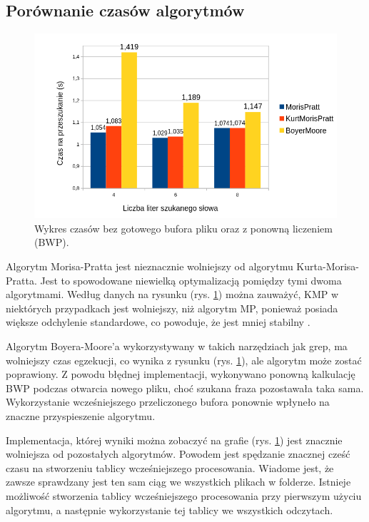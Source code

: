 \subsection{Porównanie czasów algorytmów}

\begin{figure}[htbp]
    \centering
    \includegraphics[width=\textwidth]{./images/GraphFirstAttempt.png}
    \caption{Wykres czasów bez gotowego bufora pliku oraz z ponowną 
    liczeniem (BWP).}
    \label{fig:GraphFirstAttempt}
\end{figure}

Algorytm Morisa-Pratta jest nieznacznie wolniejszy od algorytmu 
Kurta-Morisa-Pratta. Jest to spowodowane niewielką optymalizacją pomiędzy tymi 
dwoma algorytmami. Według danych na rysunku (rys. \ref{fig:GraphFirstAttempt}) można 
zauważyć, KMP w niektórych przypadkach jest wolniejszy, niż algorytm MP, 
ponieważ posiada większe odchylenie standardowe, co powoduje, że jest mniej
stabilny \label{text:stabilnośćGC}. 

Algorytm Boyera-Moore'a wykorzystywany w takich narzędziach jak grep, ma 
wolniejszy czas egzekucji, co wynika z rysunku (rys. \ref{fig:GraphFirstAttempt}), ale 
algorytm może zostać poprawiony. Z powodu błędnej implementacji, wykonywano
ponowną kalkulację BWP podczas otwarcia nowego pliku, choć szukana fraza pozostawała
taka sama. Wykorzystanie wcześniejszego przeliczonego bufora ponownie wpłyneło na znaczne
przyspieszenie algorytmu.

Implementacja, której wyniki można zobaczyć na grafie (rys. \ref{fig:GraphFirstAttempt}) jest
znacznie wolniejsza od pozostałych algorytmów. Powodem jest spędzanie znacznej
cześć czasu na stworzeniu tablicy wcześniejszego procesowania. Wiadome jest, że zawsze 
sprawdzany jest ten sam ciąg we wszystkich plikach w folderze. Istnieje możliwość 
stworzenia tablicy wcześniejszego procesowania przy pierwszym użyciu algorytmu, a następnie
wykorzystanie tej tablicy we wszystkich odczytach.

